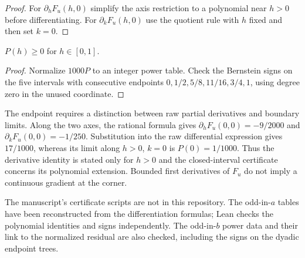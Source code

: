 \begin{proof}
\leanok
For $\partial_hF_u(h,0)$ simplify the axis restriction to a polynomial
near $h>0$ before differentiating. For $\partial_kF_u(h,0)$ use the
quotient rule with $h$ fixed and then set $k=0$.
\end{proof}

\begin{lemma}
\label{cert:robin}
\leanok
$P(h)\ge0$ for $h\in[0,1]$.
\end{lemma}

\begin{proof}
\leanok
Normalize $1000P$ to an integer power table. Check the Bernstein signs on
the five intervals with consecutive endpoints $0,1/2,5/8,11/16,3/4,1$,
using degree zero in the unused coordinate.
\end{proof}

\begin{remark}
The endpoint requires a distinction between raw partial derivatives and boundary
limits. Along the two axes, the rational formula gives
$\partial_hF_u(0,0)=-9/2000$ and $\partial_kF_u(0,0)=-1/250$.
Substitution into the raw differential expression gives $17/1000$,
whereas its limit along $h>0$, $k=0$ is $P(0)=1/1000$.
Thus the derivative identity is stated only for $h>0$ and the closed-interval
certificate concerns its polynomial extension. Bounded first derivatives of
$F_u$ do not imply a continuous gradient at the corner.
\end{remark}

\begin{remark}
The manuscript's certificate scripts are not in this repository.
The odd-in-$a$ tables have been reconstructed from the differentiation
formulas; Lean checks the polynomial identities and signs independently.
The odd-in-$b$ power data and their link to the normalized residual are
also checked, including the signs on the dyadic endpoint trees.
\end{remark}
